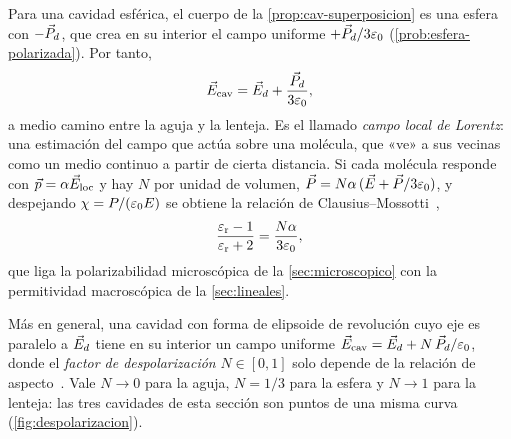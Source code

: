 \begin{observacion}\label{obs:lorentz}
Para una cavidad esférica, el cuerpo de la \cref{prop:cav-superposicion} es una esfera con $-\vec P_d$, que crea en su interior el campo
uniforme $+\vec P_d/3\varepsilon_0$ (\cref{prob:esfera-polarizada}). Por tanto,
\[
  \vec E_{\mathrm{cav}}=\vec E_d+\frac{\vec P_d}{3\varepsilon_0},
\]
a medio camino entre la aguja y la lenteja. Es el llamado \emph{campo local de Lorentz}: una estimación del campo que actúa
sobre una molécula, que «ve» a sus vecinas como un medio continuo a partir de cierta distancia. Si cada molécula
responde con $\vec p=\alpha\vec E_{\mathrm{loc}}$ y hay $N$ por unidad de volumen, $\vec P=N\alpha\,(\vec E+\vec P/3\varepsilon_0)$, y despejando $\chi=P/(\varepsilon_0 E)$ se obtiene
la relación de Clausius--Mossotti~\cite{Griffiths,Jackson},
\[
  \frac{\varepsilon_{\mathrm r}-1}{\varepsilon_{\mathrm r}+2}=\frac{N\alpha}{3\varepsilon_0},
\]
que liga la polarizabilidad microscópica de la \cref{sec:microscopico} con la permitividad macroscópica de la
\cref{sec:lineales}.
\end{observacion}

\begin{observacion}\label{obs:elipsoide}
Más en general, una cavidad con forma de elipsoide de revolución cuyo eje es paralelo a $\vec E_d$ tiene en su interior un campo
uniforme $\vec E_{\mathrm{cav}}=\vec E_d+N\,\vec P_d/\varepsilon_0$, donde el \emph{factor de despolarización} $N\in[0,1]$ solo depende de la relación de aspecto~\cite{Osborn,Landau}.
Vale $N\to0$ para la aguja, $N=1/3$ para la esfera y $N\to1$ para la lenteja: las tres cavidades de esta sección son puntos de
una misma curva (\cref{fig:despolarizacion}).
\end{observacion}


